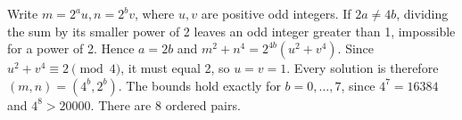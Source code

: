 Write $m=2^a u,n=2^b v$, where $u,v$ are positive odd integers. If $2a\ne4b$, dividing the sum by its smaller power of 2 leaves an odd integer greater than 1, impossible for a power of 2. Hence $a=2b$ and $m^2+n^4=2^{4b}(u^2+v^4)$. Since $u^2+v^4\equiv2\pmod4$, it must equal 2, so $u=v=1$. Every solution is therefore $(m,n)=(4^b,2^b)$. The bounds hold exactly for $b=0,\ldots,7$, since $4^7=16384$ and $4^8>20000$. There are $\boxed8$ ordered pairs.
